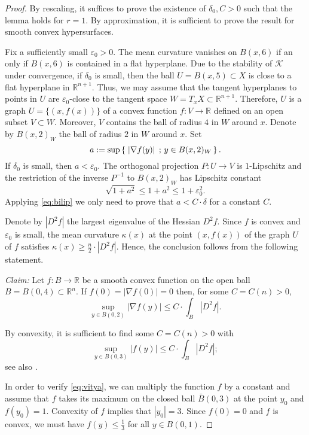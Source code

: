 \documentclass[12pt,leqno,intlimits]{amsart}
\numberwithin{equation}{section}
\theoremstyle{definition}
\theoremstyle{remark}
\newcommand{\R}{\mathbb{R}}
\def\:{\colon}
\newcommand*{\set}[2]{\left\{\,\left.{#1}\vphantom{#2}\,\right.;\,{#2}\,\right\}}
\begin{document}
\begin{proof}
By rescaling, it suffices to prove the existence of $\delta _0, C>0$ such that the lemma holds for $r=1$.
By approximation, it is sufficient to prove the result for smooth convex hypersurfaces.

Fix a sufficiently small $\varepsilon _0>0$.
The mean curvature vanishes on $B (x,6)$ if an only if $B(x,6)$ is contained in a flat hyperplane.
Due to the stability of $\mathcal K$ under convergence, if $\delta_0$ is small, then
the ball $U=B (x,{5}) \subset X$ is close to a flat hyperplane in $\R^{n+1}$.
Thus, we may assume that the tangent hyperplanes to points in $U$ are $\varepsilon_0$-close to the tangent
space $W =T_xX \subset \R^{n+1}$. Therefore, $U$ is a graph $U=\{(x,f(x))\}$ of a convex function $f\:V\to \R$ defined on an open subset $V\subset W$. Moreover, $V$ contains the ball of radius $4$ in $W$ around $x$.
Denote by $B(x,2)_W$ the ball of radius $2$ in $W$ around $x$.
Set
$$a :=\sup \set{|\nabla f (y)|}{y\in B(x,2)_W}.$$
If $\delta_0$ is small, then $a<\varepsilon_0$.
The orthogonal projection $P\:U\to V$ is $1$-Lipschitz and the restriction of the inverse $P^{-1}$ to $B(x,2)_W$ has Lipschitz constant $$\sqrt {1+ a^2} \leq 1+a^2 \leq 1+\varepsilon_0 ^2.$$
Applying \eqref{eq:bilip} we only need to prove that $a < C \cdot \delta $ for a constant $C$.

Denote by $|D^2f|$ the largest eigenvalue of the Hessian $D^2f$.
Since $f$ is convex and $\varepsilon _0$ is small, the mean curvature $\mathcal \kappa (x)$ at the point $(x,f(x))$ of the graph $U$ of $f$ satisfies $\kappa (x) \geq \frac n 2 \cdot |D^2 f|$. Hence, the conclusion follows from the following statement.

\emph{Claim:} Let $f:B \to \R$ be a smooth convex function on the open ball $B=B (0,4)\subset \R^n$.
If $f(0)=|\nabla f(0)| =0$ then, for some $C=C(n)>0$,
$$\sup_{y\in B (0,2)} |\nabla f (y)| \leq C\cdot \int _{B} |D^2f|.$$

By convexity, it is sufficient to find some $C=C(n)>0$ with
\begin{equation} \label{eq:vitya}
\sup _{y\in B (0,3) }| f(y)| \leq C \cdot \int _{B} |D^2f|;
\end{equation}
see also \cite[Theorem 6.7]{Evans}.

In order to verify \eqref{eq:vitya}, we can multiply the function $f$ by a constant and assume that
$f$ takes its maximum on the closed ball $\bar B (0,3)$ at the point $y_0$ and $f(y_0)=1$.
Convexity of $f$ implies that $|y_0|=3$.
Since $f(0)=0$ and $f$ is convex, we must have $f(y)\leq \frac 1 3$ for all $y\in B(0,1)$.


\end{proof}
\end{document}

